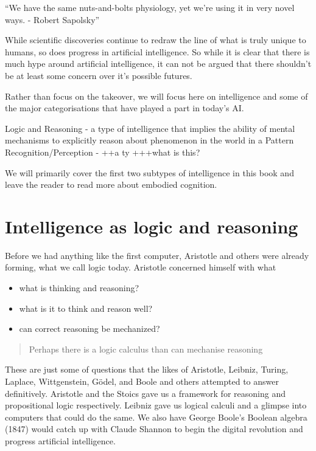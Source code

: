 \documentclass[]{book}
\providecommand{\tightlist}{%
  \setlength{\itemsep}{0pt}\setlength{\parskip}{0pt}}
\theoremstyle{definition}
\theoremstyle{definition}
\theoremstyle{definition}
\theoremstyle{remark}
\begin{document}
``We have the same nuts-and-bolts physiology, yet we're using it in very
novel ways. - Robert Sapolsky''

While scientific discoveries continue to redraw the line of what is
truly unique to humans, so does progress in artificial intelligence. So
while it is clear that there is much hype around artificial
intelligence, it can not be argued that there shouldn't be at least some
concern over it's possible futures.

Rather than focus on the takeover, we will focus here on intelligence
and some of the major categorisations that have played a part in today's
AI.

Logic and Reasoning - a type of intelligence that implies the ability of
mental mechanisms to explicitly reason about phenomenon in the world in
a Pattern Recognition/Perception - ++a ty +++what is this?

We will primarily cover the first two subtypes of intelligence in this
book and leave the reader to read more about embodied cognition.

\section{Intelligence as logic and
reasoning}\label{intelligence-as-logic-and-reasoning}

Before we had anything like the first computer, Aristotle and others
were already forming, what we call logic today. Aristotle concerned
himself with what

\begin{itemize}
\tightlist
\item
  what is thinking and reasoning?
\item
  what is it to think and reason well?
\item
  can correct reasoning be mechanized?
\end{itemize}

\begin{quote}
Perhaps there is a logic calculus than can mechanise reasoning
\end{quote}

These are just some of questions that the likes of Aristotle, Leibniz,
Turing, Laplace, Wittgenstein, Gödel, and Boole and others attempted to
answer definitively. Aristotle and the Stoics gave us a framework for
reasoning and propositional logic respectively. Leibniz gave us logical
calculi and a glimpse into computers that could do the same. We also
have George Boole's Boolean algebra (1847) would catch up with Claude
Shannon to begin the digital revolution and progress artificial
intelligence.
\end{document}

